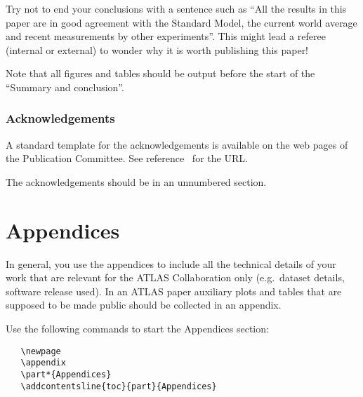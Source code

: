 \documentclass[coverpage]{style/atlasdoc}
\begin{document}
Try not to end your conclusions with a sentence such as
``All the results in this paper are in good agreement with the
Standard Model, the current world average and recent
measurements by other experiments''. This might lead a referee
(internal or external) to wonder why it is worth publishing this
paper!

Note that all figures and tables should be output before the start of the
``Summary and conclusion''. 


\section*{Acknowledgements}
\label{sec:acknowldge}

A standard template for the acknowledgements is available on the
web pages of the Publication Committee.
See reference~\cite{publication-policy} for the URL. 

The acknowledgements should be in an unnumbered section.


\printbibliography
% 
% 


\newpage
\appendix
\part*{Appendices}

In general, you use the appendices to include all the technical details of your work
that are relevant for the ATLAS Collaboration only (e.g.\ dataset details, software release used).
In an ATLAS paper auxiliary plots and tables that are supposed to be made public 
should be collected in an appendix.

Use the following commands to start the Appendices section:
\begin{verbatim}
   \newpage
   \appendix
   \part*{Appendices}
   \addcontentsline{toc}{part}{Appendices}
\end{verbatim}
\end{document}
